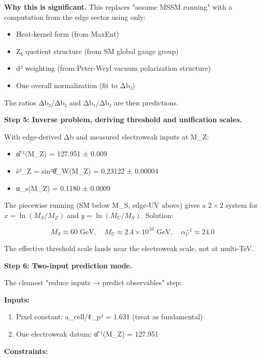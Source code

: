 \textbf{Why this is significant.} This replaces "assume MSSM running" with a computation from the edge sector using only:

\begin{itemize}
\tightlist
\item
  Heat-kernel form (from MaxEnt)
\item
  Z₆ quotient structure (from SM global gauge group)
\item
  d² weighting (from Peter-Weyl vacuum polarization structure)
\item
  One overall normalization (fit to Δb₂)
\end{itemize}

The ratios Δb₃/Δb₂ and Δb₁/Δb₂ are then predictions.

\textbf{Step 5: Inverse problem, deriving threshold and unification scales.}

With edge-derived Δb and measured electroweak inputs at M\_Z:

\begin{itemize}
\tightlist
\item
  \^{α}⁻¹(M\_Z) = 127.951 ± 0.009
\item
  \^{s}²\_Z = sin²\^{θ}\_W(M\_Z) = 0.23122 ± 0.00004
\item
  α\_s(M\_Z) = 0.1180 ± 0.0009
\end{itemize}

The piecewise running (SM below M\_S, edge-UV above) gives a \(2\times 2\) system for \(x = \ln(M_S/M_Z)\) and \(y = \ln(M_U/M_S)\). Solution:

\[
M_S \approx 60 \text{ GeV}, \quad M_U \approx 2.4 \times 10^{16} \text{ GeV}, \quad \alpha_U^{-1} \approx 24.0
\]

The effective threshold scale lands near the electroweak scale, not at multi-TeV.

\textbf{Step 6: Two-input prediction mode.}

The cleanest "reduce inputs → predict observables" step:

\textbf{Inputs:}

\begin{enumerate}
\def\labelenumi{\arabic{enumi}.}
\tightlist
\item
  Pixel constant: a\_cell/ℓ\_p² = 1.631 (treat as fundamental)
\item
  One electroweak datum: \^{α}⁻¹(M\_Z) = 127.951
\end{enumerate}

\textbf{Constraints:}

